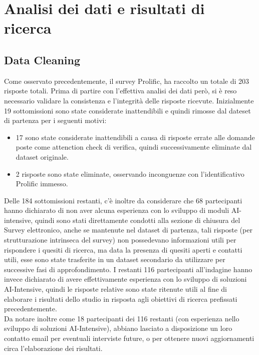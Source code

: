 \chapter{Analisi dei dati e  risultati di ricerca} %
%

     \section{Data Cleaning}
    
    Come osservato precedentemente, il survey Prolific, ha raccolto un totale di 203 risposte totali. Prima di partire con l'effettiva analisi dei dati però, si è reso necessario validare la consistenza e l'integrità delle risposte ricevute. Inizialmente 19 sottomissioni sono state considerate inattendibili e quindi rimosse dal dateset di partenza per i seguenti motivi:
    
    \begin{itemize}
        \item 17 sono state considerate inattendibili a causa di risposte errate alle domande poste come attenction check di verifica, quindi successivamente eliminate dal dataset originale.
        \item 2 risposte sono state eliminate, osservando inconguenze con l'identificativo Prolific immesso.
    \end{itemize}
     
    Delle 184 sottomissioni restanti, c'è inoltre da considerare che 68 partecipanti hanno dichiarato di non aver alcuna esperienza con lo sviluppo di moduli AI-intensive, quindi sono stati direttamente condotti alla sezione di chiusura del Survey elettronico, anche se mantenute nel dataset di partenza, tali risposte (per strutturazione intrinseca del survey) non possedevano informazioni utili per rispondere i quesiti di ricerca, ma data la presenza di quesiti aperti e contatti utili, esse sono state trasferite in un dataset secondario da utilizzare per successive fasi di approfondimento. I restanti 116 partecipanti all'indagine hanno invece dichiarato di avere effettivamente esperienza con lo sviluppo di soluzioni AI-Intensive, quindi le risposte relative sono state ritenute utili al fine di elaborare i risultati dello studio in risposta agli obiettivi di ricerca prefissati precedentemente.\\  
    
    
    Da notare inoltre come 18 partecipanti dei 116 restanti (con esperienza nello sviluppo di soluzioni AI-Intensive), abbiano lasciato a disposizione un loro contatto email per eventuali interviste future, o per ottenere nuovi aggiornamenti circa l'elaborazione dei risultati.  
    
